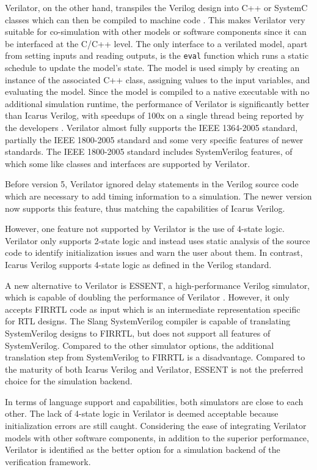 Verilator, on the other hand, transpiles the Verilog design into C++ or SystemC classes which can then be compiled
to machine code \cite{verilator}. This makes Verilator very suitable for co-simulation with other models
or software components since it can be interfaced at the C/C++ level. The only interface to a verilated
model, apart from setting inputs and reading outputs, is the \texttt{eval} function which runs a static schedule to
update the model's state. The model is used simply by creating an instance of the associated C++ class, assigning values to the
input variables, and evaluating the model. Since the model is compiled to a native executable with
no additional simulation
runtime, the performance of Verilator is significantly better than Icarus Verilog, with speedups of 100x on a single
thread being reported by the developers \cite{verilator}. Verilator almost fully supports the IEEE 1364-2005
standard, partially the IEEE 1800-2005 standard and some very specific features of newer standards. The IEEE
1800-2005 standard includes SystemVerilog features, of which some like classes and interfaces are supported by Verilator.

Before version 5, Verilator ignored delay statements in the Verilog source code which are necessary to add timing
information to a simulation. The newer version now supports this feature, thus matching the capabilities of Icarus Verilog.

However, one feature not supported by Verilator is the use of 4-state logic. Verilator only supports 2-state logic and instead uses
static analysis of the source code to identify initialization issues and warn the user about them. In contrast, Icarus
Verilog supports 4-state logic as defined in the Verilog standard.

A new alternative to Verilator is ESSENT, a high-performance Verilog simulator, which is capable of doubling the
performance of Verilator \cite{beamer2021essent}. However, it only accepts FIRRTL code as input which is an intermediate representation specific for RTL
designs. The Slang SystemVerilog compiler \cite{slang} is capable of translating SystemVerilog designs to
FIRRTL, but does not support all features of SystemVerilog. Compared to the other simulator options, the additional translation step from SystemVerilog to FIRRTL is a disadvantage. Compared to the maturity of both Icarus Verilog and Verilator, ESSENT is not the preferred choice for the simulation backend.

In terms of language support and capabilities, both simulators are close to each other. The lack of 4-state
logic in Verilator is deemed acceptable because initialization errors are still caught. Considering the ease of
integrating Verilator models with other software components, in addition to the
superior performance, Verilator is identified as the better option for a simulation backend of the verification framework.

